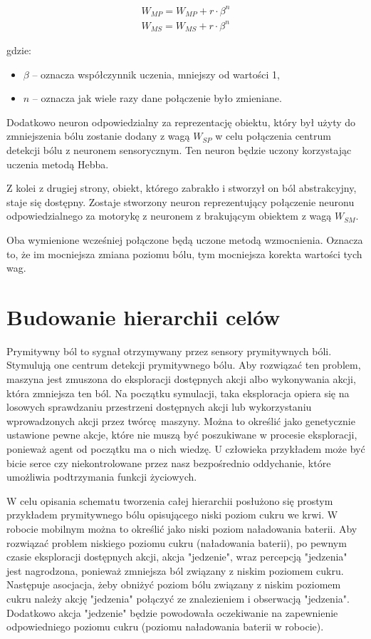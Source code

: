 \begin{equation}
	\label{equ:weights_update}
	\begin{aligned}
		W_{MP} = W_{MP} + r \cdot \beta ^ n \\
		W_{MS} = W_{MS} + r \cdot \beta ^ n
	\end{aligned}
\end{equation}

gdzie:
\begin{itemize}
	\item $\beta$ -- oznacza współczynnik uczenia, mniejszy od wartości 1,
	\item $n$ -- oznacza jak wiele razy dane połączenie było zmieniane.
\end{itemize}

Dodatkowo neuron odpowiedzialny za reprezentację obiektu, który był użyty do 
zmniejszenia bólu zostanie dodany z wagą $W_{SP}$ w celu połączenia centrum 
detekcji bólu z neuronem sensorycznym. Ten neuron będzie uczony korzystając 
uczenia metodą Hebba.

Z kolei z drugiej strony, obiekt, którego zabrakło i stworzył on ból 
abstrakcyjny, staje się dostępny. Zostaje stworzony neuron reprezentujący 
połączenie neuronu odpowiedzialnego za motorykę z neuronem z brakującym 
obiektem z wagą $W_{SM}$.

Oba wymienione wcześniej połączone będą uczone metodą wzmocnienia. Oznacza to, 
że im mocniejsza zmiana poziomu bólu, tym mocniejsza korekta wartości tych wag. 

\section{Budowanie hierarchii celów}

Prymitywny ból to sygnał otrzymywany przez sensory prymitywnych bóli. Stymulują 
one centrum detekcji prymitywnego bólu. Aby rozwiązać ten problem, maszyna jest 
zmuszona do eksploracji dostępnych akcji albo wykonywania akcji, która 
zmniejsza ten ból. Na początku symulacji, taka eksploracja opiera się na 
losowych sprawdzaniu przestrzeni dostępnych akcji lub wykorzystaniu 
wprowadzonych akcji przez twórcę maszyny. Można to określić jako genetycznie 
ustawione pewne akcje, które nie muszą być poszukiwane w procesie eksploracji, 
ponieważ agent od początku ma o nich wiedzę. U człowieka przykładem może być 
bicie serce czy niekontrolowane przez nasz bezpośrednio oddychanie, które 
umożliwia podtrzymania funkcji życiowych.

W celu opisania schematu tworzenia całej hierarchii posłużono się prostym 
przykładem prymitywnego bólu opisującego niski poziom cukru we krwi. W robocie 
mobilnym można to określić jako niski poziom naładowania baterii. Aby rozwiązać 
problem niskiego poziomu cukru (naładowania baterii), po pewnym czasie 
eksploracji dostępnych akcji, akcja "jedzenie", wraz percepcją "jedzenia" jest 
nagrodzona, ponieważ zmniejsza ból związany z niskim poziomem cukru. Następuje 
asocjacja, żeby obniżyć poziom bólu związany z niskim poziomem cukru należy 
akcję "jedzenia" połączyć ze znalezieniem i obserwacją "jedzenia". Dodatkowo 
akcja "jedzenie" będzie powodowała oczekiwanie na zapewnienie odpowiedniego 
poziomu cukru (poziomu naładowania baterii w robocie).

